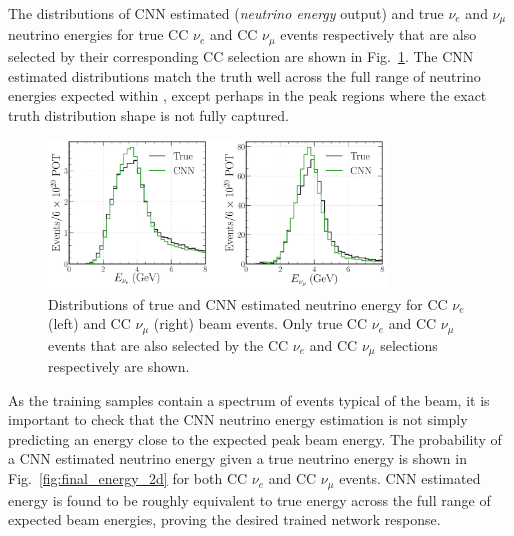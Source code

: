 The distributions of CNN estimated (\emph{neutrino energy} output) and true $\nu_{e}$ and
$\nu_{\mu}$ neutrino energies for true CC $\nu_{e}$ and CC $\nu_{\mu}$ events respectively that
are also selected by their corresponding CC selection are shown in
Fig.~\ref{fig:final_energy_dists}. The CNN estimated distributions match the truth well across the
full range of neutrino energies expected within \chipsfive, except perhaps in the peak regions
where the exact truth distribution shape is not fully captured.

\begin{figure} %
    \includegraphics[width=0.8\textwidth]{diagrams/7-results/final_energy_dists.pdf}
    \caption[Distributions of true and CNN estimated neutrino energy]
    {Distributions of true and CNN estimated neutrino energy for CC $\nu_{e}$ (left) and CC
        $\nu_{\mu}$ (right) beam events. Only true CC $\nu_{e}$ and CC $\nu_{\mu}$ events that are
        also selected by the CC $\nu_{e}$ and CC $\nu_{\mu}$ selections respectively are shown.}
    \label{fig:final_energy_dists}
\end{figure}

As the training samples contain a spectrum of events typical of the beam, it is important to check
that the CNN neutrino energy estimation is not simply predicting an energy close to the expected
peak beam energy. The probability of a CNN estimated neutrino energy given a true neutrino energy
is shown in Fig.~\ref{fig:final_energy_2d} for both CC $\nu_{e}$ and CC $\nu_{\mu}$ events. CNN
estimated energy is found to be roughly equivalent to true energy across the full range of
expected \chipsfive beam energies, proving the desired trained network response.

